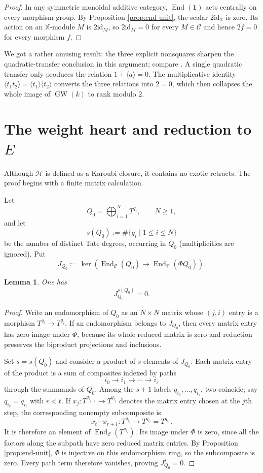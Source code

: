 \documentclass[11pt]{amsart}
\numberwithin{equation}{section}
\newtheorem{lemma}[theorem]{Lemma}
\theoremstyle{definition}
\theoremstyle{remark}
\DeclareMathOperator{\End}{End}
\DeclareMathOperator{\GW}{GW}
\newcommand{\X}{\mathbb X}
\newcommand{\one}{\mathbf 1}
\newcommand{\C}{\mathcal C}
\newcommand{\Hh}{\mathcal H}
\newcommand{\V}{\mathcal V}
\newcommand{\id}{\mathrm{id}}
\begin{document}
\begin{proof}
In any symmetric monoidal additive category, $\End(\one)$ acts centrally on
every morphism group.  By Proposition \ref{prop:end-unit}, the scalar $2\id_{\X}$ is
zero.  Its action on an $\X$-module $M$ is $2\id_M$, so $2\id_M=0$ for every
$M\in\C$ and hence $2f=0$ for every morphism $f$.
\end{proof}

We got a rather amusing result:
the three explicit nonsquares sharpen the quadratic-transfer conclusion in
this argument; compare \cite[Remark~3.6]{TananiaCellular}.  A single quadratic
transfer only produces the relation $1+\langle a\rangle=0$.  The multiplicative identity
$\langle t_1t_2\rangle=\langle t_1\rangle\langle t_2\rangle$ converts the
three relations into $2=0$, which then collapses the whole image of
$\GW(k)$ to rank modulo $2$.

\section{The weight heart and reduction to \texorpdfstring{$E$}{E}}
\label{sec:heart}

Although $\Hh$ is defined as a Karoubi closure, it contains no exotic
retracts.  The proof begins with a finite matrix calculation.

Let
\[
  Q_0=\bigoplus_{i=1}^{N}T^{q_i},
  \qquad N\ge1,
\]
and let
\[
  s(Q_0):=\#\{q_i\mid 1\le i\le N\}
\]
be the number of distinct Tate degrees, 
occurring in $Q_0$ (multiplicities are ignored).  Put
\[
  J_{Q_0}:=\ker\!\left(
  \End_{\C}(Q_0)\longrightarrow\End_{\V}(\Phi Q_0)
  \right).
\]

\begin{lemma}\label{lem:matrix-kernel}
One has
\[
  J_{Q_0}^{s(Q_0)}=0.
\]
\end{lemma}

\begin{proof}
Write an endomorphism of $Q_0$ as an $N\times N$ matrix whose $(j,i)$ entry
is a morphism $T^{q_i}\to T^{q_j}$.  If an endomorphism belongs to
$J_{Q_0}$, then every matrix entry has zero image under $\Phi$, because its
whole reduced matrix is zero and reduction preserves the biproduct
projections and inclusions.

Set $s=s(Q_0)$ and consider a product of $s$ elements of $J_{Q_0}$.  Each matrix entry of the
product is a sum of composites indexed by paths
\[
  i_0\longrightarrow i_1\longrightarrow\cdots\longrightarrow i_s
\]
through the summands of $Q_0$.  Among the $s+1$ labels
$q_{i_0},\ldots,q_{i_s}$, two coincide; say $q_{i_r}=q_{i_t}$ with
$r<t$.  If $x_j\colon T^{q_{i_{j-1}}}\to T^{q_{i_j}}$ denotes the matrix
entry chosen at the $j$th step, the corresponding nonempty subcomposite is
\[
  x_t\cdots x_{r+1}\colon
  T^{q_{i_r}}\longrightarrow T^{q_{i_t}}=T^{q_{i_r}}.
\]
It is therefore an element of $\End_{\C}(T^{q_{i_r}})$.  Its image under
$\Phi$ is zero, since all the
factors along the subpath have zero reduced matrix entries.  By Proposition
\ref{prop:end-unit}, $\Phi$ is injective on this endomorphism ring, so the
subcomposite is zero.  Every path term therefore vanishes, proving
$J_{Q_0}^{s}=0$.
\end{proof}
\end{document}
